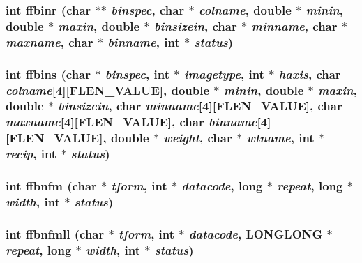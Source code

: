 \subsubsection{\setlength{\rightskip}{0pt plus 5cm}int ffbinr (char $\ast$$\ast$ {\em binspec}, char $\ast$ {\em colname}, double $\ast$ {\em minin}, double $\ast$ {\em maxin}, double $\ast$ {\em binsizein}, char $\ast$ {\em minname}, char $\ast$ {\em maxname}, char $\ast$ {\em binname}, int $\ast$ {\em status})}\label{test_2shm__client_2fitsio_8h_f9daf75aaa15d49359ba6fe025e80b86}


\subsubsection{\setlength{\rightskip}{0pt plus 5cm}int ffbins (char $\ast$ {\em binspec}, int $\ast$ {\em imagetype}, int $\ast$ {\em haxis}, char {\em colname}[4][FLEN\_\-VALUE], double $\ast$ {\em minin}, double $\ast$ {\em maxin}, double $\ast$ {\em binsizein}, char {\em minname}[4][FLEN\_\-VALUE], char {\em maxname}[4][FLEN\_\-VALUE], char {\em binname}[4][FLEN\_\-VALUE], double $\ast$ {\em weight}, char $\ast$ {\em wtname}, int $\ast$ {\em recip}, int $\ast$ {\em status})}\label{test_2shm__client_2fitsio_8h_25532ba78224456d371c8724bdbc485f}


\subsubsection{\setlength{\rightskip}{0pt plus 5cm}int ffbnfm (char $\ast$ {\em tform}, int $\ast$ {\em datacode}, long $\ast$ {\em repeat}, long $\ast$ {\em width}, int $\ast$ {\em status})}\label{test_2shm__client_2fitsio_8h_cfe4b7969d8e7484d15510380edd2b57}


\subsubsection{\setlength{\rightskip}{0pt plus 5cm}int ffbnfmll (char $\ast$ {\em tform}, int $\ast$ {\em datacode}, \bf{LONGLONG} $\ast$ {\em repeat}, long $\ast$ {\em width}, int $\ast$ {\em status})}\label{test_2shm__client_2fitsio_8h_63407aabf5d249931c496d2b4029a188}


